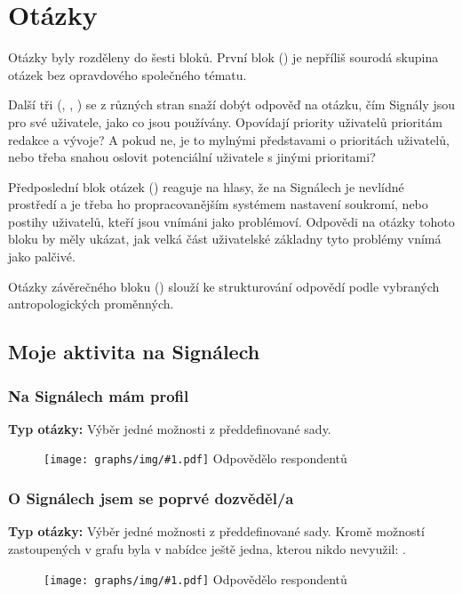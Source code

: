\documentclass[12pt, a4paper, twoside]{article}
\newcommand{\answercount}[1]{Odpovědělo  respondentů}
\newcommand{\includegraph}[2]{
  \begin{figure}[H]
    \centering
    \textbf{#2}
    \texttt{[image: graphs/img/\#1.pdf]}
    \answercount{#1}
  \end{figure}
}
\newcommand{\qtype}{\textbf{Typ otázky:}
}
\newcommand{\pickOne}{Výběr jedné možnosti z předdefinované sady\xspace}
\begin{document}
\section{Otázky}

Otázky byly rozděleny do šesti bloků.
První blok ()
je nepříliš sourodá skupina otázek bez opravdového společného tématu.

Další tři
(, , )
se z různých stran snaží dobýt odpověď na otázku, čím Signály jsou
pro své uživatele, jako co jsou používány.
Opovídají priority uživatelů prioritám redakce a vývoje?
A pokud ne, je to mylnými představami o prioritách uživatelů,
nebo třeba snahou oslovit potenciální uživatele s jinými prioritami?

Předposlední blok otázek ()
reaguje na hlasy, že na Signálech je nevlídné prostředí
a je třeba ho  propracovanějším systémem nastavení
soukromí, nebo postihy uživatelů, kteří jsou vnímáni jako problémoví.
Odpovědi na otázky tohoto bloku by měly ukázat, jak velká část
uživatelské základny tyto problémy vnímá jako palčivé.

Otázky závěrečného bloku ()
slouží ke strukturování odpovědí
podle vybraných antropologických proměnných.

\vfill

\subsection{Moje aktivita na Signálech}\label{sec:mojeaktivita}

\subsubsection{Na Signálech mám profil}

\qtype \pickOne.

\includegraph{na_signalech_mam_profil}{}

\subsubsection{O Signálech jsem se poprvé dozvěděl/a}

\qtype \pickOne.
Kromě možností zastoupených v grafu byla v nabídce ještě jedna,
kterou nikdo nevyužil: .

\includegraph{o_signalech_jsem_se_poprve_dozvedel}{}
\end{document}
